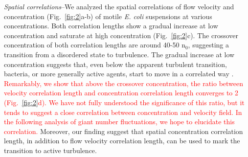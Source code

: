 \documentclass[twocolumn,aps,prl,amsmath,amssymb,longbibliography]{revtex4-2}
\begin{document}
\textit{Spatial correlations}--We analyzed the spatial correlations of flow velocity and concentration (Fig.~\ref{fig:2}a-b) of motile \textit{E. coli} suspensions at various concentrations. Both correlation lengths show a gradual increase at low concentration and saturate at high concentration (Fig.~\ref{fig:2}c). The crossover concentration of both correlation lengths are around 40-50 n$_0$, suggesting a transition from a disordered state to turbulence. The gradual increase at low concentration suggests that, even below the apparent turbulent transition, bacteria, or more generally active agents, start to move in a correlated way \cite{PhysRevLett.119.028005}. \textcolor{red}{Remarkably, we show that above the crossover concentration, the ratio between velocity correlation length and concentration correlation length converges to 2 (Fig.~\ref{fig:2}d). We have not fully understood the significance of this ratio, but it tends to suggest a close correlation between concentration and velocity field. In the following analysis of giant number fluctuations, we hope to elucidate this correlation.} Moreover, our finding suggest that spatial concentration correlation length, in addition to flow velocity correlation length\cite{Wensink14308, PhysRevLett.110.228102}, can be used to mark the transition to active turbulence.
\end{document}
